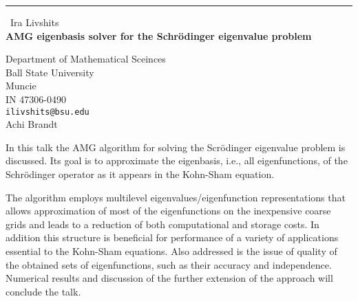 \documentclass{report}
\begin{document}
\begin{center}
\rule{6in}{1pt} \
{\large Ira Livshits \\
{\bf AMG eigenbasis solver for the Schr\"{o}dinger eigenvalue problem }}

Department of Mathematical Sceinces \\ Ball State University \\ Muncie \\ IN 47306-0490
\\
{\tt ilivshits@bsu.edu}\\
Achi Brandt \end{center}

In this talk the AMG algorithm for solving the Scr\"{o}dinger eigenvalue
problem is discussed. Its goal is to approximate the eigenbasis, i.e.,
all eigenfunctions, of the Schr\"{o}dinger operator as it appears in the
Kohn-Sham equation.

The algorithm employs multilevel eigenvalues/eigenfunction
representations that allows approximation of most of the eigenfunctions
on the inexpensive coarse grids and leads to a reduction of both
computational and storage costs. In addition this structure is beneficial
for performance of a variety of applications essential to the Kohn-Sham
equations. Also addressed is the issue of quality of the obtained
sets of eigenfunctions, such as their accuracy and independence.
Numerical results and discussion of the further extension of the approach
will conclude the talk.
\end{document}
